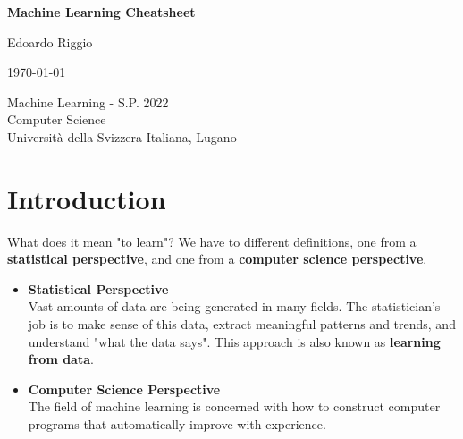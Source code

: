 \documentclass{article}
\begin{document}
\begin{titlepage}
    \begin{center}
        \vspace*{1cm}
        
        \Huge
        \textbf{Machine Learning Cheatsheet}
        
        \vspace{0.5cm}
        \LARGE
        
        \vspace{.5cm}
        
        Edoardo Riggio
   		  \vspace{1.5cm}
       
        \vfill
        
        \today
        
        \vspace{.8cm}
          \Large
          Machine Learning - S.P. 2022 \\
        Computer Science\\
        Universit\`{a} della Svizzera Italiana, Lugano\\
        
    \end{center}
\end{titlepage}

\tableofcontents

\newpage

\section{Introduction}
What does it mean "to learn"? We have to different definitions, one from a \textbf{statistical perspective}, and one from a \textbf{computer science perspective}.

\begin{itemize}
	\item \textbf{Statistical Perspective}
	\vspace{.2cm} \\
	Vast amounts of data are being generated in many fields. The statistician's job is to make sense of this data, extract meaningful patterns and trends, and understand "what the data says". This approach is also known as \textbf{learning from data}.
	
	\item \textbf{Computer Science Perspective}
	\vspace{.2cm} \\
	The field of machine learning is concerned with how to construct computer programs that automatically improve with experience.
\end{itemize}
\end{document}
